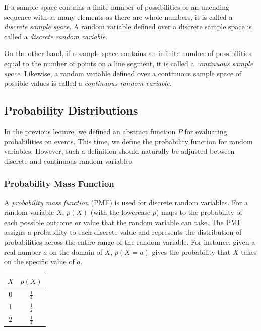 \documentclass{article}
\begin{document}
If a sample space contains a finite number of possibilities or an unending sequence with as many elements as there are whole numbers, it is called a \emph{discrete sample space}. A random variable defined over a discrete sample space is called a \emph{discrete random variable}.

On the other hand, if a sample space contains an infinite number of possibilities equal to the number of points on a line segment, it is called a \emph{continuous sample space}. Likewise, a random variable defined over a continuous sample space of possible values is called a \emph{continuous random variable}.

\subsection{Probability Distributions}

In the previous lecture, we defined an abstract function $P$ for evaluating probabilities on events. This time, we define the probability function for random variables. However, such a definition should naturally be adjusted between discrete and continuous random variables.

\subsubsection{Probability Mass Function}

A \emph{probability mass function} (PMF) is used for discrete random variables. For a random variable $X$, $p(X)$ (with the lowercase $p$) maps to the probability of each possible outcome or value that the random variable can take. The PMF assigns a probability to each discrete value and represents the distribution of probabilities across the entire range of the random variable. For instance, given a real number $a$ on the domain of $X$, $p(X = a)$ gives the probability that $X$ takes on the specific value of $a$.

\begin{margintable}
\centering
\begin{tabular}{|| c c ||} 
 \hline
 $X$ & $p(X)$ \\ [0.5ex] 
 \hline\hline
 0 & $\frac{1}{4}$ \\ 
 1 & $\frac{1}{2}$ \\
 2 & $\frac{1}{4}$ \\ [1ex] 
 \hline
\end{tabular}
\captionsetup{justification=centering}
\caption{\label{tab:coins} Probability Mass Function (PMF) written in table form for the random variable $X$ = the number of heads after tossing a coin twice.}
\end{margintable}
\end{document}
